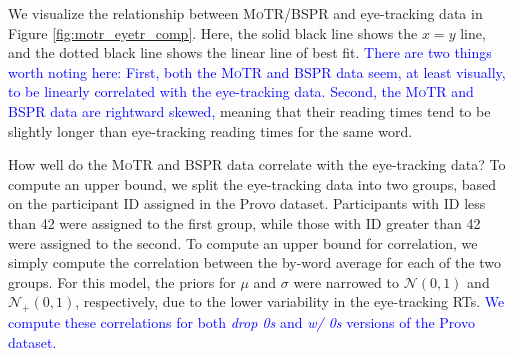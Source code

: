\documentclass[12pt]{article}
\newcommand{\motr}{\textsc{MoTR}\xspace}
\newcommand{\word}[1]{\textit{#1}}
\newcommand{\change}[1]{\textcolor{blue}{#1}}
\begin{document}
{%

We visualize the relationship between \motr/BSPR and eye-tracking data in Figure \ref{fig:motr_eyetr_comp}. Here, the solid black line shows the $x=y$ line, and the dotted black line shows the linear line of best fit. \change{There are two things worth noting here: First, both the \motr and BSPR data seem, at least visually, to be linearly correlated with the eye-tracking data. Second, the \motr and BSPR data are rightward skewed,} meaning that their reading times tend to be slightly longer than eye-tracking reading times for the same word.

How well do the \motr and BSPR data correlate with the eye-tracking data? To compute an upper bound, we split the eye-tracking data into two groups, based on the participant ID assigned in the Provo dataset. Participants with ID less than 42 were assigned to the first group, while those with ID greater than 42 were assigned to the second. To compute an upper bound for correlation, we simply compute the correlation between the by-word average for each of the two groups. For this model, the priors for \(\mu\) and \(\sigma\) were narrowed to \(\mathcal{N}(0, 1)\) and \(\mathcal{N}_{+}(0, 1)\), respectively, due to the lower variability in the eye-tracking RTs. %
\change{We compute these correlations for both \word{drop 0s} and \word{w/ 0s} versions of the Provo dataset.}

}
\end{document}
